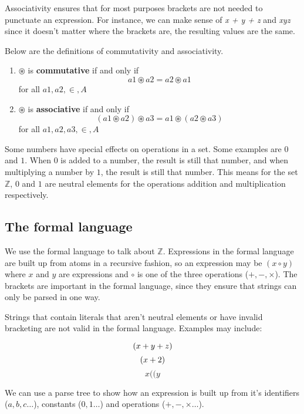 \documentclass{article}
\begin{document}
Associativity ensures that for most purposes brackets are not needed to punctuate an expression. For instance, we can make sense of {\it x + y + z} and {\it xyz} since it doesn't matter where the brackets are, the resulting values are the same.

Below are the definitions of commutativity and associativity.


\begin{enumerate}
  \item 
    $\circledast$ is {\bf commutative} if and only if
    \[
	a1 \circledast a2 = a2 \circledast a1
    \] 
    for all $a1,a2,\in,A$
  \item 
    $\circledast$ is {\bf associative} if and only if
    \[
	(a1 \circledast a2) \circledast a3 = a1 \circledast (a2 \circledast a3)
    \] 
    for all $a1,a2,a3,\in,A$
\end{enumerate}

Some numbers have special effects on operations in a set. Some examples are $0$ and $1$. When $0$ is added to a number, the result is still that number, and when multiplying a number by $1$, the result is still that number. This means for the set $\mathbb{Z}$, $0$ and $1$ are neutral elements for the operations addition and multiplication respectively.

\subsection{The formal language}

We use the formal language to talk about $\mathbb{Z}$. Expressions in the formal language are built up from atoms in a recursive fashion, so an expression may be $(x \circ y)$ where $x$ and $y$ are expressions and $\circ$ is one of the three operations ($+, -, \times$). The brackets are important in the formal language, since they ensure that strings can only be parsed in one way.

Strings that contain literals that aren't neutral elements or have invalid bracketing are not valid in the formal language. Examples may include:

\[
	(x + y + z)\\
\]
\[
	(x + 2)\\
\]
\[
	x((y
\]

We can use a parse tree to show how an expression is built up from it's identifiers ($a, b, c\ldots$), constants ($0, 1\ldots$) and operations ($+, -, \times\ldots$).
\end{document}
